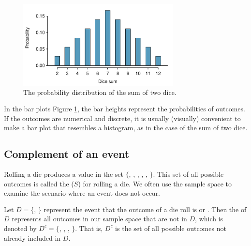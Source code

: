 \begin{figure}
\centering
\includegraphics[width=0.73\textwidth]{ch_probability/figures/diceSumDist/diceSumDist}
\caption{The probability distribution of the sum of two dice.}
\label{diceSumDist}
\end{figure}

In the bar plots Figure \ref{diceSumDist}, the bar heights represent the probabilities of outcomes. If the outcomes are numerical and discrete, it is usually (visually) convenient to make a bar plot that resembles a histogram, as in the case of the sum of two dice.

\subsection{Complement of an event}

Rolling a die produces a value in the set $\{$, , , , , $\}$. This set of all possible outcomes is called the  ($S$) for rolling a die. We often use the sample space to examine the scenario where an event does not occur.

Let $D=\{$, $\}$ represent the event that the outcome of a die roll is  or . Then the  of $D$ represents all outcomes in our sample space that are not in $D$, which is denoted by $D^c = \{$, , , $\}$. That is, $D^c$ is the set of all possible outcomes not already included in $D$.

